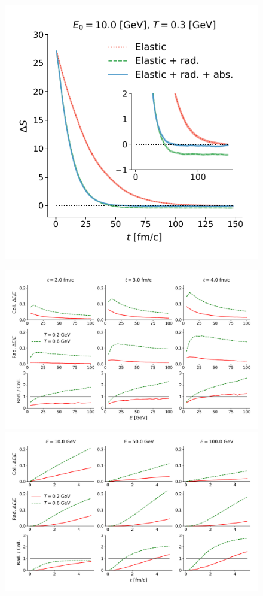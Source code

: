 \documentclass[aps, prc, reprint, amsmath, groupedaddress, nofootinbib]{revtex4-1}
\begin{document}
\begin{figure}
\includegraphics[width=\columnwidth]{charm-plot/thermalization.pdf}
\end{figure}

\begin{figure}
\includegraphics[width=\textwidth]{E_Eloss.pdf}\\
\includegraphics[width=\textwidth]{L_Eloss.pdf}
\end{figure}
\end{document}
